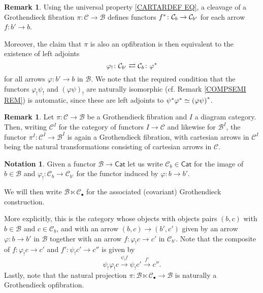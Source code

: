 \documentclass[a4paper,10pt
,draft
]{article}%
\numberwithin{equation}{section}
\numberwithin{figure}{section}
\theoremstyle{definition} %
\newtheorem{remark}[equation]{Remark}%
\newtheorem{notation}[equation]{Notation}%
\newcommand{\1}{\ensuremath{\mathbbm 1}}%
\begin{document}
\begin{remark}\label{ALSOOPADJ REM}
Using the universal property \eqref{CARTARDEF EQ},
a cleavage of a Grothendieck fibration 
$\pi \colon \mathcal{C} \to \mathcal{B}$
defines functors
$f^{\**} \colon \mathcal{C}_b \to \mathcal{C}_{b'}$
for each arrow $f \colon b' \to b$.

Moreover, 
the claim that $\pi$ is also an opfibration is then equivalent to the existence of left adjoints
\[
	\varphi_! \colon
	\mathcal{C}_{b'}
	\rightleftarrows
	\mathcal{C}_{b}
	\colon \varphi^{\**}
\]
for all arrows $\varphi \colon b' \to b$ in $\mathcal{B}$.
%
We note that the required condition that the functors
$\varphi_! \psi_!$ and
$(\varphi \psi)_!$
are naturally isomorphic (cf. Remark \ref{COMPSEMI REM})
is automatic, 
since these are left adjoints to 
$\psi^{\**} \varphi^{\**} \simeq 
\left( \varphi \psi \right)^{\**}$.
\end{remark}


\begin{remark}\label{FUNISGROTH REM}
Let $\pi \colon \mathcal{C} \to \mathcal{B}$
be a Grothendieck fibration and
$I$ a diagram category.
Then, 
writing $\mathcal{C}^{I}$ for the category of functors 
$I \to \mathcal{C}$ and likewise for $\mathcal{B}^I$,
the functor
$\pi^I \colon \mathcal{C}^I \to \mathcal{B}^I$
is again a Grothendieck fibration, with cartesian arrows in $\mathcal{C}^I$ being the natural transformations consisting of cartesian arrows in $\mathcal{C}$.
\end{remark}





\begin{notation}\label{GROTHCONS NOT}
Given a functor $\mathcal{B} \to \mathsf{Cat}$
let us write
$\mathcal{C}_b \in \mathsf{Cat}$
for the image of $b \in \mathcal{B}$ and 
$\varphi_! \colon \mathcal{C}_{b} \to \mathcal{C}_{b'}$
for the functor induced by
$\varphi \colon b \to b'$.

We will then write 
$\mathcal{B} \ltimes \mathcal{C}_{\bullet}$
for the associated (covariant) Grothendieck construction.

More explicitly, this is
the category whose objects 
with objects pairs 
$(b,c)$ with $b \in \mathcal{B}$ and $c \in \mathcal{C}_b$,
and with an arrow
$(b,c) \to (b',c')$
given by an arrow 
$\varphi \colon b \to b'$ in $\mathcal{B}$
together with an arrow
$f \colon \varphi_! c \to c'$ in $\mathcal{C}_{b'}$.
%
Note that the composite of 
$f \colon \varphi_! c \to c'$ and
$f' \colon \psi_! c' \to c''$ is given by
\[
\psi_! \varphi_! c \xrightarrow{\psi_!f}
\psi_! c' \xrightarrow{f'}
 c''.
\]
Lastly, note that the natural projection
$\pi \colon \mathcal{B} \ltimes \mathcal{C}_{\bullet} \to \mathcal{B}$
is naturally a Grothendieck opfibration.
\end{notation}
\end{document}
